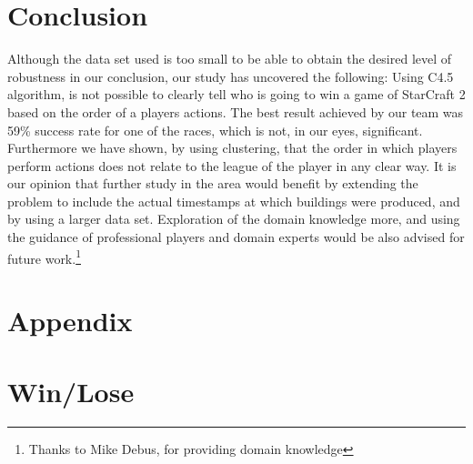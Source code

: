 \documentclass[a4paper,11pt]{article}
\begin{document}
\section{Conclusion}
Although the data set used is too small to be able to obtain the desired level of robustness in our conclusion, our study has uncovered the following:
Using C4.5 algorithm, is not possible to clearly tell who is going to win a game of StarCraft 2 based on the order of a players actions. The best result achieved by our team was 59\% success rate for one of the races, which is not, in our eyes, significant.
Furthermore we have shown, by using clustering, that the order in which players perform actions does not relate to the league of the player in any clear way.
It is our opinion that further study in the area would benefit by extending the problem to include the actual timestamps at which buildings were produced, and by using a larger data set. Exploration of the domain knowledge more, and using the guidance of professional players and domain experts would be also advised for future work.\footnote{Thanks to Mike Debus, for providing domain knowledge}

\newpage

\section*{Appendix}
\appendix
\section{Win/Lose}
\end{document}
